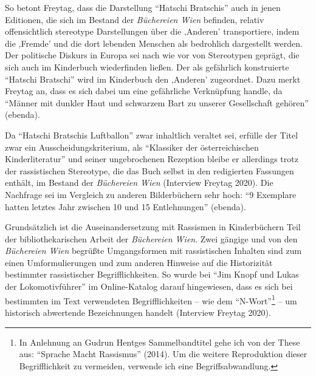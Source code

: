 \documentclass[a4paper,
fontsize=11pt,
oneside,
numbers=noperiodatend,
parskip=half-,
bibliography=totoc,
final
]{scrartcl}
\begin{document}
So betont Freytag, dass die Darstellung \enquote{Hatschi Bratschis} auch in
jenen Editionen, die sich im Bestand der \emph{Büchereien Wien}
befinden, relativ offensichtlich stereotype Darstellungen über die
‚Anderen' transportiere, indem die ‚Fremde' und die dort lebenden
Menschen als bedrohlich dargestellt werden. Der politische Diskurs in
Europa sei nach wie vor von Stereotypen geprägt, die sich auch im
Kinderbuch wiederfinden ließen. Der als gefährlich konstruierte
\enquote{Hatschi Bratschi} wird im Kinderbuch den ‚Anderen' zugeordnet. Dazu
merkt Freytag an, dass es sich dabei um eine gefährliche Verknüpfung
handle, da \enquote{Männer mit dunkler Haut und schwarzem Bart zu unserer
Gesellschaft gehören} (ebenda).

Da \enquote{Hatschi Bratschis Luftballon} zwar inhaltlich veraltet sei,
erfülle der Titel zwar ein Ausscheidungskriterium, als \enquote{Klassiker der
österreichischen Kinderliteratur} und seiner ungebrochenen Rezeption
bleibe er allerdings trotz der rassistischen Stereotype, die das Buch
selbst in den redigierten Fassungen enthält, im Bestand der
\emph{Büchereien Wien} (Interview Freytag 2020). Die Nachfrage sei im
Vergleich zu anderen Bilderbüchern sehr hoch: \enquote{9 Exemplare hatten
letztes Jahr zwischen 10 und 15 Entlehnungen} (ebenda).

Grundsätzlich ist die Auseinandersetzung mit Rassismen in Kinderbüchern
Teil der bibliothekarischen Arbeit der \emph{Büchereien Wien}. Zwei
gängige und von den \emph{Büchereien Wien} begrüßte Umgangsformen mit
rassistischen Inhalten sind zum einen Umformulierungen und zum anderen
Hinweise auf die Historizität bestimmter rassistischer
Begrifflichkeiten. So wurde bei \enquote{Jim Knopf und Lukas der
Lokomotivführer} im Online-Katalog darauf hingewiesen, dass es sich bei
bestimmten im Text verwendeten Begrifflichkeiten -- wie dem
\enquote{N-Wort}\footnote{In Anlehnung an Gudrun Hentges Sammelbandtitel gehe
  ich von der These aus: \enquote{Sprache Macht Rassismus} (2014). Um die
  weitere Reproduktion dieser Begrifflichkeit zu vermeiden, verwende ich
  eine Begriffsabwandlung.} -- um historisch abwertende Bezeichnungen
handelt (Interview Freytag 2020).
\end{document}
